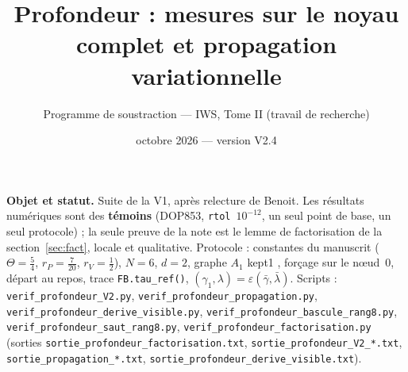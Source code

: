\documentclass[11pt,a4paper]{article}
\title{Profondeur : mesures sur le noyau complet et propagation variationnelle}
\author{Programme de soustraction --- IWS, Tome II (travail de recherche)}
\date{octobre 2026 --- version V2.4}
\theoremstyle{remark}
\begin{document}
\maketitle

\noindent\textbf{Objet et statut.} Suite de la V1, apr\`es relecture de Benoit. Les r\'esultats num\'eriques sont des \textbf{t\'emoins} (DOP853, \texttt{rtol}~$10^{-12}$, un seul point de base, un seul protocole) ; la seule preuve de la note est le lemme de factorisation de la section~\ref{sec:fact}, locale et qualitative. Protocole : constantes du manuscrit ($\Theta=\frac54$, $r_P=\frac7{20}$, $r_V=\frac12$), $N=6$, $d=2$, graphe $A_1$ \og kept1 \fg, for\c{c}age sur le n\oe ud~0, d\'epart au repos, trace \texttt{FB.tau\_ref()}, $(\gamma_1,\lambda)=\varepsilon(\bar\gamma,\bar\lambda)$. Scripts : \texttt{verif\_profondeur\_V2.py}, \texttt{verif\_profondeur\_propagation.py}, \texttt{verif\_profondeur\_derive\_visible.py}, \texttt{verif\_profondeur\_bascule\_rang8.py}, \texttt{verif\_profondeur\_saut\_rang8.py}, \texttt{verif\_profondeur\_factorisation.py} (sorties \texttt{sortie\_profondeur\_factorisation.txt},  \texttt{sortie\_profondeur\_V2\_*.txt}, \texttt{sortie\_propagation\_*.txt}, \texttt{sortie\_profondeur\_derive\_visible.txt}).
\end{document}
